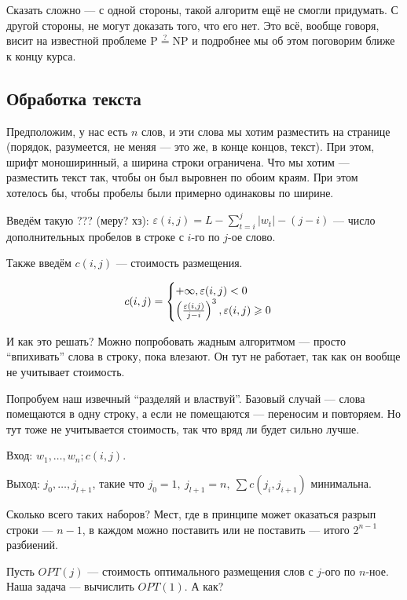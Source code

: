 Сказать сложно --- с одной стороны, такой алгоритм ещё не смогли придумать. С другой стороны, не могут доказать того, что его нет. Это всё, вообще говоря, висит на известной проблеме $\mathrm{P} \mathrel{\overset{?}{=}} \mathrm{NP}$ и подробнее мы об этом поговорим ближе к концу курса.

\subsection{Обработка текста}
Предположим, у нас есть $n$ слов, и эти слова мы хотим разместить на странице (порядок, разумеется, не меняя --- это же, в конце концов, текст). При этом, шрифт моноширинный, а ширина строки ограничена. Что мы хотим --- разместить текст так, чтобы он был выровнен по обоим краям. При этом хотелось бы, чтобы пробелы были примерно одинаковы по ширине.

Введём такую ??? (меру? хз): $\varepsilon(i, j) = L-\sum\limits_{t=i}^j|w_t|-(j-i)$ --- число дополнительных пробелов в строке с $i$-го по $j$-ое слово.

Также введём $c(i, j)$ --- стоимость размещения.

\[
    c(i, j) = \begin{cases}
        +\infty, \varepsilon(i, j) < 0\\
        \left( \frac{\varepsilon(i, j)}{j-i} \right)^3, \varepsilon(i, j) \geqslant 0\\
    \end{cases}
\]

И как это решать? Можно попробовать жадным алгоритмом --- просто ``впихивать'' слова в строку, пока влезают. Он тут не работает, так как он вообще не учитывает стоимость.

Попробуем наш извечный ``разделяй и властвуй''. Базовый случай --- слова помещаются в одну строку, а если не помещаются --- переносим и повторяем. Но тут тоже не учитывается стоимость, так что вряд ли будет сильно лучше.

Вход: $w_1, \ldots, w_n; c(i, j)$.

Выход: $j_0, \ldots, j_{l+1}$, такие что $j_0 = 1,\ j_{l+1} = n,\ \sum c(j_i, j_{i+1})$ минимальна.

Сколько всего таких наборов? Мест, где в принципе может оказаться разрып строки --- $n-1$, в каждом можно поставить или не поставить --- итого $2^{n-1}$ разбиений.

Пусть $OPT(j)$ --- стоимость оптимального размещения слов с $j$-ого по $n$-ное. Наша задача --- вычислить $OPT(1)$. А как?

